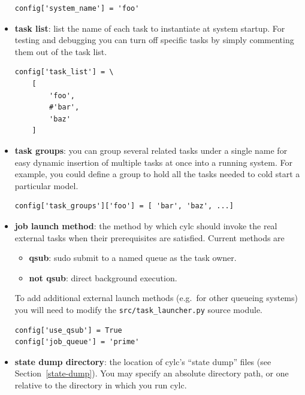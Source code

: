 \documentclass[11pt,a4paper]{article}
\begin{document}
\begin{itemize} 
    
        \begin{lstlisting}
config['system_name'] = 'foo'
        \end{lstlisting}

    \item {\bf task list}: list the name of each task to instantiate at
        system startup.  For testing and debugging you can turn off
        specific tasks by simply commenting them out of the task list.
        
        \begin{lstlisting}
config['task_list'] = \
    [
        'foo',
        #'bar',
        'baz'
    ]
        \end{lstlisting}


    \item {\bf task groups}: you can group several related tasks under a
        single name for easy dynamic insertion of multiple tasks at
        once into a running system. For example, you could define a 
        group to hold all the tasks needed to cold start a particular
        model.

        \begin{lstlisting}
config['task_groups']['foo'] = [ 'bar', 'baz', ...]
        \end{lstlisting}

    \item {\bf job launch method}: the method by which cylc should
        invoke the real external tasks when their prerequisites are
        satisfied. Current methods are
        \begin{itemize}
            \item {\bf qsub}: sudo submit to a named queue as the task
                owner.  
            \item {\bf not qsub}: direct background execution.
        \end{itemize}
        To add additional external launch methods (e.g.\ for other
        queueing systems) you will need to modify the 
        \lstinline{src/task_launcher.py} source module.

        \begin{lstlisting}
config['use_qsub'] = True
config['job_queue'] = 'prime'
        \end{lstlisting}

    \item {\bf state dump directory}: the location of cylc's ``state
        dump'' files (see Section~\ref{state-dump}).  You may
        specify an absolute directory path, or one relative to the
        directory in which you run cylc.
        

\end{itemize}
\end{document}

